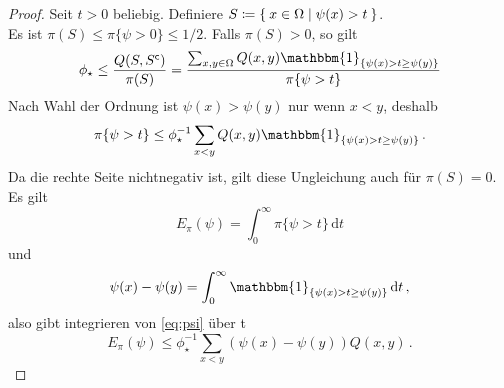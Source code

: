 \documentclass[ngerman,a4paper,11pt]{scrartcl}
\newcommand{\stcomp}[1]{{#1}^{\mathsf{c}}} %
\begin{document}
\begin{proof}
 Seit $t>0$ beliebig. Definiere $S\coloneqq\Set{x\in\Omega\mid \psi(x)>t}$. \\
 Es ist ${\pi(S)\leq\pi\{\psi>0\}\leq 1/2}$. Falls $\pi(S)>0$, so gilt
 \begin{equation*}
  \phi_\star\leq\frac{Q(S,\stcomp{S})}{\pi(S)}=\frac{\sum_{x,y\in\Omega}Q(x,y)\mathbbm{1}_{\{\psi(x)>t\geq\psi(y)\}}}{\pi\{\psi>t\}} 
 \end{equation*}
 Nach Wahl der Ordnung ist $\psi(x)>\psi(y)$ nur wenn $x<y$, deshalb
 \begin{equation}
  \label{eq:psi}
  \pi\{\psi>t\}\leq\phi_\star^{-1}\sum_{x<y}Q(x,y)\mathbbm{1}_{\{\psi(x)>t\geq\psi(y)\}}\, .
 \end{equation}
 Da die rechte Seite nichtnegativ ist, gilt diese Ungleichung auch für
 $\pi(S)=0$. Es gilt
 \begin{equation*}
  E_\pi(\psi)=\int_0^\infty\pi\{\psi>t\}\,\mathrm{d}t
 \end{equation*}
 und
 \begin{equation*}
  \psi(x)-\psi(y)=\int_0^\infty\mathbbm{1}_{\{\psi(x)>t\geq\psi(y)\}}\,\mathrm{d}t\, ,
 \end{equation*}
 also gibt integrieren von \cref{eq:psi} über t
 \begin{equation*}
  E_\pi(\psi)\leq\phi_\star^{-1}\sum_{x<y}(\psi(x)-\psi(y))Q(x,y)\, .
 \end{equation*}
\end{proof}
\end{document}
